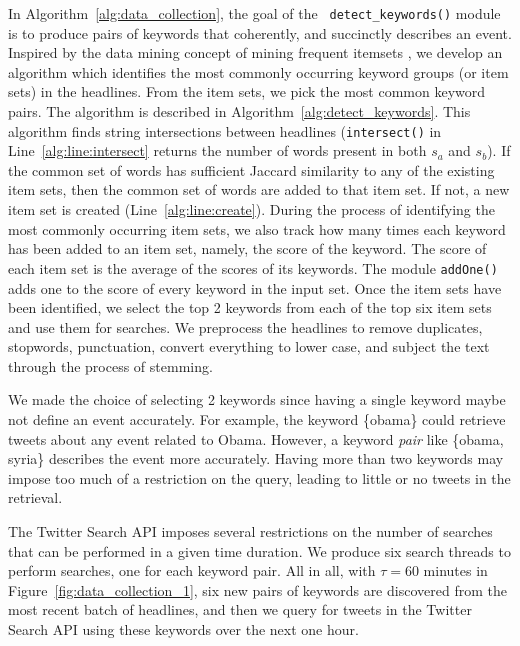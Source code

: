 In Algorithm~\ref{alg:data_collection}, the goal of the {\tt
  detect\_keywords()} module is to produce pairs of keywords that
coherently, and succinctly describes an event. Inspired by the data
mining concept of mining frequent itemsets \cite{Tan_Steinbach_Kumar},
we develop an algorithm which identifies the most commonly occurring
keyword groups (or item sets) in the headlines. From the item sets, we
pick the most common keyword pairs. The algorithm is described in
Algorithm~\ref{alg:detect_keywords}. This algorithm finds string
intersections between headlines ({\tt intersect()} in
Line~\ref{alg:line:intersect} returns the number of words present in
both $s_a$ and $s_b$). If the common set of words has sufficient
Jaccard similarity to any of the existing item sets, then the common
set of words are added to that item set. If not, a new item set is
created (Line~\ref{alg:line:create}). During the process of
identifying the most commonly occurring item sets, we also track how
many times each keyword has been added to an item set, namely, the
score of the keyword. The score of each item set is the average of the
scores of its
keywords. The module \texttt{addOne()} adds one to the score
of every keyword in the input set.%
Once the item sets have been identified, we select the top 2 keywords
from each of the top six item sets and use them for searches. We
preprocess the headlines to remove duplicates, stopwords, punctuation,
convert everything to lower case, and subject the text through the
process of stemming.

We made the choice of selecting 2 keywords since having a single
keyword maybe not define an event accurately. For example, the keyword
\{obama\} could retrieve tweets about any event related to Obama.
However, a keyword \emph{pair} like \{obama, syria\} describes the
event more accurately.  Having more than two keywords may impose
too much of a restriction on the query, leading to little
or no tweets in the retrieval.

The Twitter Search API imposes several restrictions on the number of
searches that can be performed in a given time duration.
We produce six search threads to perform searches, one for each
keyword pair. All in all, with $\tau = 60$ minutes in
Figure~\ref{fig:data_collection_1}, six new pairs of keywords are
discovered from the most recent batch of headlines, and then we query
for tweets in the Twitter Search API using these keywords over the
next one hour.

